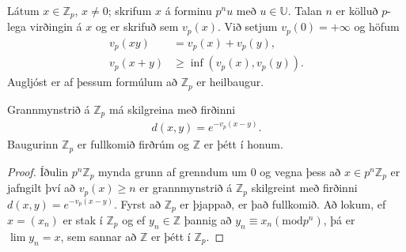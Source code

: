 \begin{Rit}
Látum $x \in \mathbb{Z}_p$, $x \neq 0$; skrifum $x$ á forminu $p^nu$ með 
$u \in \mathbb{U}$. Talan $n$ er kölluð $p$-lega virðingin á $x$ og er skrifuð sem 
$v_p(x)$. Við setjum $v_p(0) = +\infty$ og höfum 
\begin{align*}
 v_p(xy) &= v_p(x) + v_p(y), \\
 v_p(x+y) &\geq \inf(v_p(x),v_p(y)).
\end{align*}
Augljóst er af þessum formúlum að $\mathbb{Z}_p$ er heilbaugur.
\end{Rit}
\begin{setn}
 Grannmynstrið á $\mathbb{Z}_p$ má skilgreina með firðinni
\begin{align}
 d(x,y) = e^{-v_p(x-y)}.
\end{align}
Baugurinn $\mathbb{Z}_p$ er fullkomið firðrúm og $\mathbb{Z}$  er þétt 
í honum.
\end{setn}
\begin{proof}
 Íðulin $p^n \mathbb{Z}_p$ mynda grunn af grenndum um 0 og vegna þess að 
$x \in p^n \mathbb{Z}_p$ er jafngilt því að $v_p(x) \geq n$ er grannmynstrið 
á $\mathbb{Z}_p$ skilgreint með firðinni $d(x,y) = e^{-v_p(x-y)}$. 
Fyrst að $\mathbb{Z}_p$ er þjappað, er það fullkomið. Að lokum, ef $x = (x_n)$
 er stak í $\mathbb{Z}_p$ og ef $y_n \in \mathbb{Z}$ þannig að 
$y_n \equiv x_n(\mbox{mod} p^n)$, þá er $\lim y_n = x$, sem sannar að $\mathbb{Z}$ 
er þétt í $\mathbb{Z}_p$.
\end{proof}

